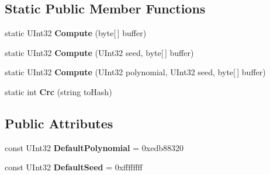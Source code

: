\subsection*{Static Public Member Functions}
\begin{DoxyCompactItemize}
\item 
\hypertarget{class_s_q_l_indexer_1_1_string_c_r_c_a79d300e93b5953fab9c9c4adbc8f4205}{static U\-Int32 {\bfseries Compute} (byte\mbox{[}$\,$\mbox{]} buffer)}\label{class_s_q_l_indexer_1_1_string_c_r_c_a79d300e93b5953fab9c9c4adbc8f4205}

\item 
\hypertarget{class_s_q_l_indexer_1_1_string_c_r_c_a303cf1a3e84ac799ee4223cca298915a}{static U\-Int32 {\bfseries Compute} (U\-Int32 seed, byte\mbox{[}$\,$\mbox{]} buffer)}\label{class_s_q_l_indexer_1_1_string_c_r_c_a303cf1a3e84ac799ee4223cca298915a}

\item 
\hypertarget{class_s_q_l_indexer_1_1_string_c_r_c_a608886c7a8d4b26a3977316e2b57a5a0}{static U\-Int32 {\bfseries Compute} (U\-Int32 polynomial, U\-Int32 seed, byte\mbox{[}$\,$\mbox{]} buffer)}\label{class_s_q_l_indexer_1_1_string_c_r_c_a608886c7a8d4b26a3977316e2b57a5a0}

\item 
\hypertarget{class_s_q_l_indexer_1_1_string_c_r_c_a2e542c9c46f3894a90ddd22155f9c09d}{static int {\bfseries Crc} (string to\-Hash)}\label{class_s_q_l_indexer_1_1_string_c_r_c_a2e542c9c46f3894a90ddd22155f9c09d}

\end{DoxyCompactItemize}
\subsection*{Public Attributes}
\begin{DoxyCompactItemize}
\item 
\hypertarget{class_s_q_l_indexer_1_1_string_c_r_c_a86b3c321de86204c84b854009095409c}{const U\-Int32 {\bfseries Default\-Polynomial} = 0xedb88320}\label{class_s_q_l_indexer_1_1_string_c_r_c_a86b3c321de86204c84b854009095409c}

\item 
\hypertarget{class_s_q_l_indexer_1_1_string_c_r_c_aa1f4c6a3db9e0798186423777a36fd32}{const U\-Int32 {\bfseries Default\-Seed} = 0xffffffff}\label{class_s_q_l_indexer_1_1_string_c_r_c_aa1f4c6a3db9e0798186423777a36fd32}

\end{DoxyCompactItemize}

